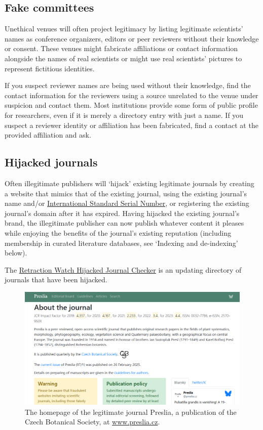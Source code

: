 \documentclass[letterpaper, 12pt]{article}
\begin{document}
\subsection*{Fake committees}

Unethical venues will often project legitimacy by listing legitimate scientists' names as conference organizers, editors or peer reviewers without their knowledge or consent. These venues might fabricate affiliations or contact information alongside the names of real scientists or might use real scientists' pictures to represent fictitious identities. 

If you suspect reviewer names are being used without their knowledge, find the contact information for the reviewers
using a source unrelated to the venue under suspicion and contact them. Most institutions provide some form of public profile for researchers,
even if it is merely a directory entry with just a name.
If you suspect a reviewer identity or affiliation has been fabricated, find a contact at the provided affiliation and ask.

\subsection*{Hijacked journals}

Often illegitimate publishers will `hijack' existing legitimate journals by creating a website that mimics that of the existing journal, using the existing journal's name and/or \href{https://portal.issn.org/}{International Standard Serial Number}, or registering the existing journal's domain after it has expired. Having hijacked the existing journal's brand, the illegitimate publisher can now publish whatever content it pleases while enjoying the benefits of the journal's existing reputation (including membership in curated literature databases, see `Indexing and de-indexing' below).

The \href{https://retractionwatch.com/the-retraction-watch-hijacked-journal-checker/}{Retraction Watch Hijacked Journal Checker} is an updating directory of journals that have been hijacked.

\pagebreak

\begin{figure}[h!tbp]
    \centering
    \includegraphics[width=\textwidth]{img/venues/Preslia original.png}
    \caption*{The homepage of the legitimate journal Preslia, a publication of the Czech Botanical Society, at \href{https://www.preslia.cz}{www.preslia.cz}.}
\end{figure}
\end{document}
